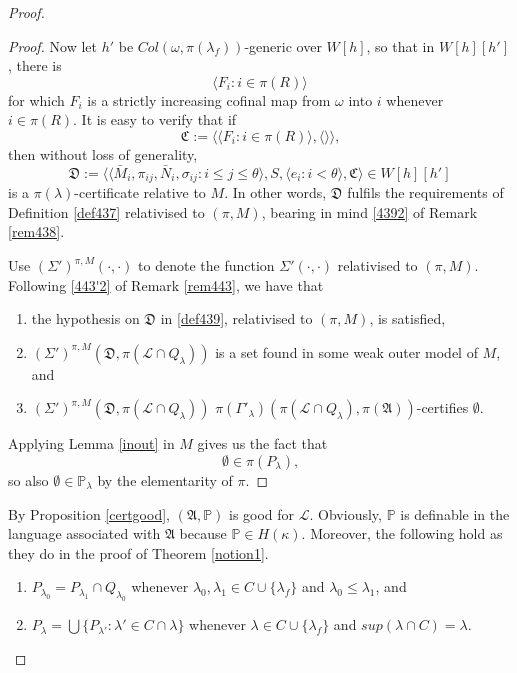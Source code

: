 \documentclass[12pt]{article}
\numberwithin{equation}{section}
\begin{document}
\begin{proof}
\begin{proof}
Now let $h'$ be $Col(\omega, \pi(\lambda_f))$-generic over $W[h]$, so that in $W[h][h']$, there is 
\begin{equation*}
    \langle F_i : i \in \pi(R) \rangle
\end{equation*}
for which $F_i$ is a strictly increasing cofinal map from $\omega$ into $i$ whenever $i \in \pi(R)$. It is easy to verify that if
\begin{equation*}
    \mathfrak{C} := \langle \langle F_i : i \in \pi(R) \rangle, \langle \rangle \rangle \text{,}
\end{equation*}
then without loss of generality,
\begin{equation*}
    \mathfrak{D} := \langle \langle \bar{M}_i, \pi_{ij},  \bar{N}_i, \sigma_{ij} : i \leq j \leq \theta \rangle, S, \langle e_i : i < \theta \rangle, \mathfrak{C} \rangle \in W[h][h']
\end{equation*}
is a $\pi(\lambda)$-certificate relative to $M$. In other words, $\mathfrak{D}$ fulfils the requirements of Definition \ref{def437} relativised to $(\pi, M)$, bearing in mind \ref{4392} of Remark \ref{rem438}. 

Use $(\Sigma')^{\pi, M}(\cdot, \cdot)$ to denote the function $\Sigma'(\cdot, \cdot)$ relativised to $(\pi, M)$. Following \ref{443'2} of Remark \ref{rem443}, we have that
\begin{enumerate}[label=(\alph*)]
    \item the hypothesis on $\mathfrak{D}$ in \ref{def439}, relativised to $(\pi, M)$, is satisfied, 
    \item $(\Sigma')^{\pi, M}(\mathfrak{D}, \pi(\mathcal{L} \cap Q_{\lambda}))$ is a set found in some weak outer model of $M$, and
    \item $(\Sigma')^{\pi, M}(\mathfrak{D}, \pi(\mathcal{L} \cap Q_{\lambda}))$ $\pi(\Gamma'_{\lambda}) (\pi(\mathcal{L} \cap Q_{\lambda}), \pi(\mathfrak{A}))$-certifies $\emptyset$. 
\end{enumerate}
Applying Lemma \ref{inout} in $M$ gives us the fact that 
\begin{equation*}
    \emptyset \in \pi(P_{\lambda}) \text{,}
\end{equation*}
so also $\emptyset \in \mathbb{P}_{\lambda}$ by the elementarity of $\pi$. 
\end{proof}

By Proposition \ref{certgood}, $(\mathfrak{A}, \mathbb{P})$ is good for $\mathcal{L}$. Obviously, $\mathbb{P}$ is definable in the language associated with $\mathfrak{A}$ because $\mathbb{P} \in H(\kappa)$. Moreover, the following hold as they do in the proof of Theorem \ref{notion1}.
\begin{enumerate}[label=(P\arabic*), leftmargin=40pt]
    \item\label{p1'} $P_{\lambda_0} = P_{\lambda_1} \cap Q_{\lambda_0}$ whenever $\lambda_0, \lambda_1 \in C \cup \{\lambda_f\}$ and $\lambda_0 \leq \lambda_1$, and
    \item\label{p2'} $P_{\lambda} = \bigcup \{P_{\lambda'} : \lambda' \in C \cap \lambda\}$ whenever $\lambda \in C \cup \{\lambda_f\}$ and $sup(\lambda \cap C) = \lambda$.
\end{enumerate}


\end{proof}
\end{document}
